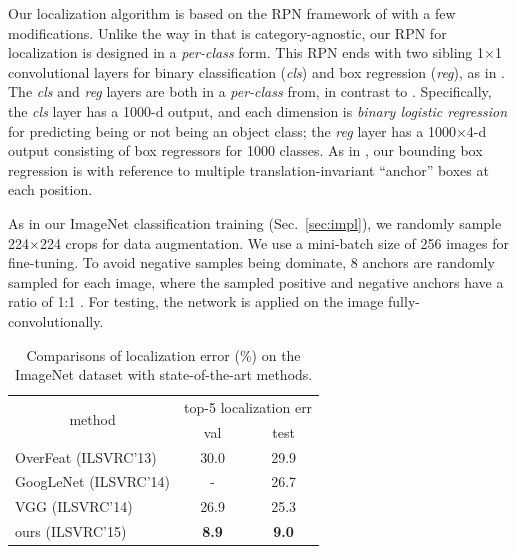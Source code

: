 \documentclass[10pt,twocolumn,letterpaper]{article}
\renewcommand\arraystretch{1.2}
\begin{document}
Our localization algorithm is based on the RPN framework of \cite{Ren2015} with a few modifications.
Unlike the way in \cite{Ren2015} that is category-agnostic, our RPN for localization is designed in a \emph{per-class} form. This RPN ends with two sibling 1$\times$1 convolutional layers for binary classification (\emph{cls}) and box regression (\emph{reg}), as in \cite{Ren2015}. The \emph{cls} and \emph{reg} layers are both in a \emph{per-class} from, in contrast to \cite{Ren2015}. Specifically, the \emph{cls} layer has a 1000-d output, and each dimension is \emph{binary logistic regression} for predicting being or not being an object class; the \emph{reg} layer has a 1000$\times$4-d output consisting of box regressors for 1000 classes.
As in \cite{Ren2015}, our bounding box regression is with reference to multiple translation-invariant ``anchor'' boxes at each position.

As in our ImageNet classification training (Sec.~\ref{sec:impl}), we randomly sample 224$\times$224 crops for data augmentation. We use a mini-batch size of 256 images for fine-tuning.
To avoid negative samples being dominate, 8 anchors are randomly sampled for each image, where the sampled positive and negative anchors have a ratio of 1:1 \cite{Ren2015}. For testing, the network is applied on the image fully-convolutionally.

\renewcommand\arraystretch{1.05}
\setlength{\tabcolsep}{10pt}
\begin{table}[t]
  \begin{center}
    \small
    \begin{tabular}{l|c|c}
      \hline
      \multicolumn{1}{c|}{\multirow{2}{*}{method}} & \multicolumn{2}{c}{top-5 localization err}                \\\cline{2-3}
                                                   & val                                        & test         \\
      \hline
      OverFeat \cite{Sermanet2014} (ILSVRC'13)     & 30.0                                       & 29.9         \\
      GoogLeNet \cite{Szegedy2015} (ILSVRC'14)     & -                                          & 26.7         \\
      VGG \cite{Simonyan2015} (ILSVRC'14)          & 26.9                                       & 25.3         \\
      \hline
      ours (ILSVRC'15)                             & \textbf{8.9}                               & \textbf{9.0} \\
      \hline
    \end{tabular}
  \end{center}
  \vspace{-.5em}
  \caption{Comparisons of localization error (\%) on the ImageNet dataset with state-of-the-art methods.
  }
  \vspace{-.5em}
  \label{tab:localization_all}
\end{table}
\end{document}
